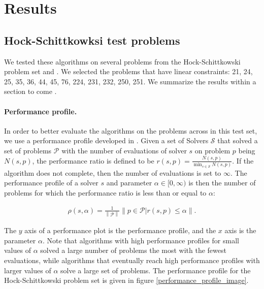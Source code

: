 \documentclass{article}
\begin{document}
\section{Results}


\subsection{Hock-Schittkowksi test problems}


We tested these algorithms on several problems from the Hock-Schittkowski problem set \cite{Schittkowski1981MoreTE} and \cite{Hock1980}.
We selected the problems that have linear constraints: 21, 24, 25, 35, 36, 44, 45, 76, 224, 231, 232, 250, 251.
We summarize the results within \color{magenta} a section to come \color{black}.


\paragraph*{Performance profile.}
\label{performance_profile}
In order to better evaluate the algorithms on the problems across in this test set, we use a performance profile developed in \cite{More:2009:BDO:1654367.1654371}.
Given a set of Solvers $\mathcal S$ that solved a set of problems $\mathcal P$ with the number of evaluations of solver $s$ on problem $p$ being $N(s, p)$, the performance ratio is defined to be $r(s, p) = \frac{N(s, p)}{\min_{s \in \mathcal S} N(s, p)}$.
If the algorithm does not complete, then the number of evaluations is set to $\infty$.
The performance profile of a solver $s$ and parameter $\alpha \in [0, \infty)$ is then the number of problems for which the performance ratio is less than or equal to $\alpha$: 

\begin{align}
\rho(s, \alpha) = \frac 1 {\left\|\mathcal P \right\|} \left\|p \in \mathcal P | r(s, p) \le \alpha\right\|.
\end{align}

The $y$ axis of a performance plot is the performance profile, and the $x$ axis is the parameter $\alpha$.
Note that algorithms with high performance profiles for small values of $\alpha$ solved a large number of problems the most with the fewest evaluations, while algorithms that eventually reach high performance profiles with larger values of $\alpha$ solve a large set of problems.
The performance profile for the Hock-Schittkowski problem set is given in figure \cref{performance_profile_image}.
\end{document}
